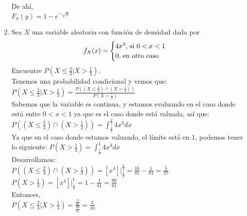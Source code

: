 \documentclass[12pt,a4paper]{report}
\begin{document}
\begin{enumerate}
{            De ahí,\\
            $F_{x}(y) =  1 - e^{-\sqrt{y}}$\\
		}
		
		\item {
			Sea $X$ una variable aleatoria con función de densidad dada por
			\[
				f_X(x) = \begin{cases}
							4x^3, $ si $ 0 < x < 1\\
							0, $ en otro caso$
						 \end{cases}
			\]
			Encuentre $P(X \leq \frac{2}{3}|X > \frac{1}{3})$.\\
			
			Tenemos una probabilidad condicional y vemos que:\\
			
			 $P(X \leq \frac{2}{3}|X > \frac{1}{3}) = \frac{P((X \leq \frac{2}{3}) \cap (X > \frac{1}{3}))}{P(X > \frac{1}{3})}$\\
			 
			 Sabemos que la variable es continua, y estamos evaluando en el caso donde está entre $ 0 < x < 1$ ya que es el caso donde está valuada,  así que:\\
			 
			 $P((X \leq \frac{2}{3}) \cap (X > \frac{1}{3})) = \int_{\frac{1}{3}}^{\frac{2}{3}} 4x^3 dx$ \\
			 
			 Ya que en el caso donde estamos valuando, el límite está en 1, podemos tener lo siguiente:
			 $P(X > \frac{1}{3}) = \int_{\frac{1}{3}}^{1} 4x^3 dx$\\
			 
			 Desarrollamos:\\
			 $P((X \leq \frac{2}{3}) \cap (X > \frac{1}{3})) = 
			 \left[x^4\right]\Big|_{\frac{1}{3}}^{\frac{2}{3}}=
			 \frac{16}{81} - \frac{1}{81} = \frac{5}{27}$\\
			 
			 $P(X > \frac{1}{3}) = 
			 \left[x^4\right]\Big|_{\frac{1}{3}}^{1}=
			 1 - \frac{1}{81} = \frac{80}{81}$\\
			 
			 Entonces,\\
			 $P(X \leq \frac{2}{3}|X > \frac{1}{3})
			 = \frac{\frac{5}{27}}{\frac{80}{81}}
			 = \frac{3}{16}$
		}
	\end{enumerate}
\end{document}
